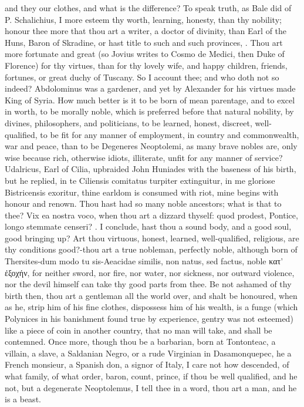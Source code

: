 {and they our clothes, and what is the difference? To speak truth, as
Bale did of P. Schalichius, I more esteem thy worth, learning,
honesty, than thy nobility; honour thee more that thou art a writer, a
doctor of divinity, than Earl of the Huns, Baron of Skradine, or hast
title to such and such provinces, \etc{}. Thou art more fortunate and great
(so Jovius writes to Cosmo de Medici, then Duke of Florence) for
thy virtues, than for thy lovely wife, and happy children, friends,
fortunes, or great duchy of Tuscany. So I account thee; and who doth
not so indeed? Abdolominus was a gardener, and yet by Alexander
for his virtues made King of Syria. How much better is it to be born of
mean parentage, and to excel in worth, to be morally noble, which is
preferred before that natural nobility, by divines, philosophers, and
politicians, to be learned, honest, discreet, well-qualified, to
be fit for any manner of employment, in country and commonwealth, war
and peace, than to be Degeneres Neoptolemi, as many brave nobles are,
only wise because rich, otherwise idiots, illiterate, unfit for any
manner of service?  Udalricus, Earl of Cilia, upbraided John
Huniades with the baseness of his birth, but he replied, in te
Ciliensis comitatus turpiter extinguitur, in me gloriose Bistricensis
exoritur, thine earldom is consumed with riot, mine begins with honour
and renown. Thou hast had so many noble ancestors; what is that to
thee? Vix ea nostra voco, when thou art a dizzard thyself: quod
prodest, Pontice, longo stemmate censeri? \etc{}. I conclude, hast thou a
sound body, and a good soul, good bringing up? Art thou virtuous,
honest, learned, well-qualified, religious, are thy conditions
good?-thou art a true nobleman, perfectly noble, although born of
Thersites-dum modo tu sis-Aeacidae similis, non natus, sed factus,
noble κατ' ἐξοχήν, for neither sword, nor fire, nor water, nor
sickness, nor outward violence, nor the devil himself can take thy good
parts from thee. Be not ashamed of thy birth then, thou art a gentleman
all the world over, and shalt be honoured, when as he, strip him of his
fine clothes, dispossess him of his wealth, is a funge (which
 Polynices in his banishment found true by experience, gentry was
not esteemed) like a piece of coin in another country, that no man will
take, and shall be contemned. Once more, though thou be a barbarian,
born at Tontonteac, a villain, a slave, a Saldanian Negro, or a rude
Virginian in Dasamonquepec, he a French monsieur, a Spanish don, a
signor of Italy, I care not how descended, of what family, of what
order, baron, count, prince, if thou be well qualified, and he not, but
a degenerate Neoptolemus, I tell thee in a word, thou art a man, and he
is a beast.

}
